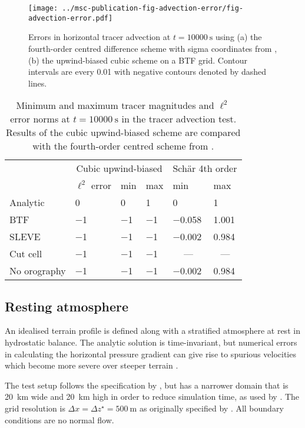 \documentclass[twocol]{ametsoc}
\begin{document}
\begin{figure}
	\centering
	\texttt{[image: ../msc-publication-fig-advection-error/fig-advection-error.pdf]}
	\caption{Errors in horizontal tracer advection at \(t = \SI{10000}{\second}\) using (a) the fourth-order centred difference scheme with sigma coordinates from \citet{schaer2002}, (b) the upwind-biased cubic scheme on a BTF grid.  Contour intervals are every 0.01 with negative contours denoted by dashed lines.}
	\label{fig:advection-error}
\end{figure}

\begin{table}[t]
	\caption{Minimum and maximum tracer magnitudes and \(\ell^2\) error norms at \(t = \SI{10000}{\second}\) in the tracer advection test.  Results of the cubic upwind-biased scheme are compared with the fourth-order centred scheme from \citet{schaer2002}.}
\label{tab:advection}
%
\centering
\footnotesize
\begin{tabular}{ l l l l l l }
\hline\hline
& \multicolumn{3}{c}{Cubic upwind-biased} & \multicolumn{2}{c}{Sch\"ar 4th order} \\
& \(\ell^2\) error & min & max & min & max \\
\hline
Analytic  & 0 & 0 & 1 & 0 & 1 \\
BTF 	  & \num{-1} & \num{-1} & \num{-1} & \num{-0.058} & \num{1.001} \\
SLEVE 	  & \num{-1} & \num{-1} & \num{-1} & \num{-0.002} & \num{0.984} \\
Cut cell  & \num{-1} & \num{-1} & \num{-1} & \multicolumn{1}{c}{---} & \multicolumn{1}{c}{---} \\
No orography & \num{-1} & \num{-1} & \num{-1} & \num{-0.002} & \num{0.984} \\
\hline
\end{tabular}
\end{table}


\subsection{Resting atmosphere}
An idealised terrain profile is defined along with a stratified atmosphere at rest in hydrostatic balance.  The analytic solution is time-invariant, but numerical errors in calculating the horizontal pressure gradient can give rise to spurious velocities which become more severe over steeper terrain \citet{klemp2011}.

The test setup follows the specification by \cite{klemp2011}, but has a narrower domain that is \SI{20}{\kilo\meter} wide and \SI{20}{\kilo\meter} high in order to reduce simulation time, as used by \citet{weller-shahrokhi2014}.  The grid resolution is \(\Delta x = \Delta z^\star = \SI{500}{\meter}\) as originally specified by \citet{klemp2011}.  All boundary conditions are no normal flow.
\end{document}

